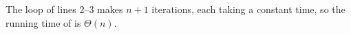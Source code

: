 The  loop of lines 2--3 makes $n+1$ iterations, each taking a constant time, so the running time of  is $\Theta(n)$.
